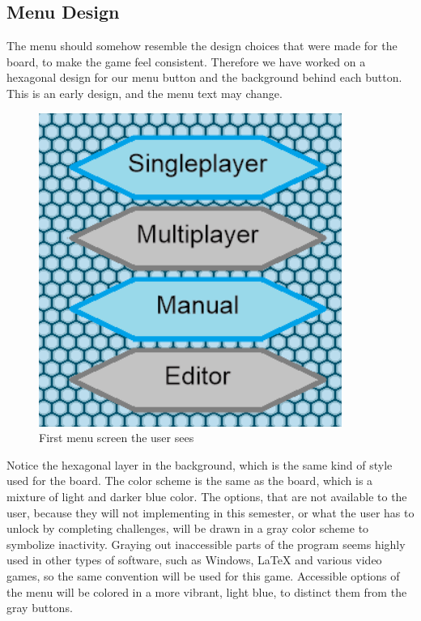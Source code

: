 \subsection{Menu Design}
The menu should somehow resemble the design choices that were made for the board, to make the game feel consistent.
Therefore we have worked on a hexagonal design for our menu button and the background behind each button.
This is an early design, and the menu text may change.\newline

\begin{figure}[h]
	\centering
		\includegraphics{img/Menu1.png}
	\caption{First menu screen the user sees}
	\label{fig:menu1}
\end{figure}

Notice the hexagonal layer in the background, which is the same kind of style used for the board.
The color scheme is the same as the board, which is a mixture of light and darker blue color. 
The options, that are not available to the user, because they will not implementing in this semester, or what the user has to unlock by completing challenges, will be drawn in a gray color scheme to symbolize inactivity.
Graying out inaccessible parts of the program seems highly used in other types of software, such as Windows, LaTeX and various video games, so the same convention will be used for this game.
Accessible options of the menu will be colored in a more vibrant, light blue, to distinct them from the gray buttons.\newline


